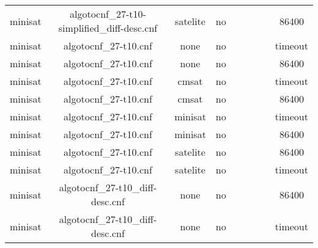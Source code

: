 \begin{appendices}
\begin{table}[p]
\begin{center}
\begin{tabular}{l|cccccccc}
  minisat                        & algotocnf\_27-t10-simplified\_diff-desc.cnf & satelite   & no    &            &           &           &            & 86400 \\ %
  minisat                        & algotocnf\_27-t10.cnf          & none       & no    &            &           &           &            & timeout \\ %
  minisat                        & algotocnf\_27-t10.cnf          & none       & no    &            &           &           &            & 86400 \\ %
  minisat                        & algotocnf\_27-t10.cnf          & cmsat      & no    &            &           &           &            & timeout \\ %
  minisat                        & algotocnf\_27-t10.cnf          & cmsat      & no    &            &           &           &            & 86400 \\ %
  minisat                        & algotocnf\_27-t10.cnf          & minisat    & no    &            &           &           &            & timeout \\ %
  minisat                        & algotocnf\_27-t10.cnf          & minisat    & no    &            &           &           &            & 86400 \\ %
  minisat                        & algotocnf\_27-t10.cnf          & satelite   & no    &            &           &           &            & 86400 \\ %
  minisat                        & algotocnf\_27-t10.cnf          & satelite   & no    &            &           &           &            & timeout \\ %
  minisat                        & algotocnf\_27-t10\_diff-desc.cnf & none       & no    &            &           &           &            & 86400 \\ %
  minisat                        & algotocnf\_27-t10\_diff-desc.cnf & none       & no    &            &           &           &            & timeout \\ %

\end{tabular}
\end{center}
\end{table}
\end{appendices}
